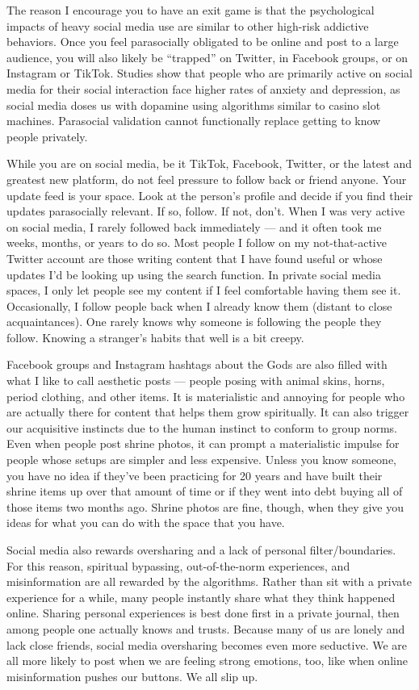 \documentclass[
]{book}
\begin{document}
The reason I encourage you to have an exit game is that the psychological impacts of heavy social media use are similar to other high-risk addictive behaviors. Once you feel parasocially obligated to be online and post to a large audience, you will also likely be ``trapped'' on Twitter, in Facebook groups, or on Instagram or TikTok. Studies show that people who are primarily active on social media for their social interaction face higher rates of anxiety and depression, as social media doses us with dopamine using algorithms similar to casino slot machines. Parasocial validation cannot functionally replace getting to know people privately.

While you are on social media, be it TikTok, Facebook, Twitter, or the latest and greatest new platform, do not feel pressure to follow back or friend anyone. Your update feed is your space. Look at the person's profile and decide if you find their updates parasocially relevant. If so, follow. If not, don't. When I was very active on social media, I rarely followed back immediately --- and it often took me weeks, months, or years to do so. Most people I follow on my not-that-active Twitter account are those writing content that I have found useful or whose updates I'd be looking up using the search function. In private social media spaces, I only let people see my content if I feel comfortable having them see it. Occasionally, I follow people back when I already know them (distant to close acquaintances). One rarely knows why someone is following the people they follow. Knowing a stranger's habits that well is a bit creepy.

Facebook groups and Instagram hashtags about the Gods are also filled with what I like to call aesthetic posts --- people posing with animal skins, horns, period clothing, and other items. It is materialistic and annoying for people who are actually there for content that helps them grow spiritually. It can also trigger our acquisitive instincts due to the human instinct to conform to group norms. Even when people post shrine photos, it can prompt a materialistic impulse for people whose setups are simpler and less expensive. Unless you know someone, you have no idea if they've been practicing for 20 years and have built their shrine items up over that amount of time or if they went into debt buying all of those items two months ago. Shrine photos are fine, though, when they give you ideas for what you can do with the space that you have.

Social media also rewards oversharing and a lack of personal filter/boundaries. For this reason, spiritual bypassing, out-of-the-norm experiences, and misinformation are all rewarded by the algorithms. Rather than sit with a private experience for a while, many people instantly share what they think happened online. Sharing personal experiences is best done first in a private journal, then among people one actually knows and trusts. Because many of us are lonely and lack close friends, social media oversharing becomes even more seductive. We are all more likely to post when we are feeling strong emotions, too, like when online misinformation pushes our buttons. We all slip up.
\end{document}
